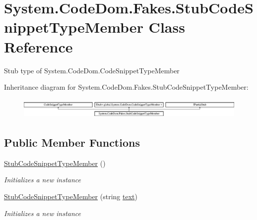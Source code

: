 \hypertarget{class_system_1_1_code_dom_1_1_fakes_1_1_stub_code_snippet_type_member}{\section{System.\-Code\-Dom.\-Fakes.\-Stub\-Code\-Snippet\-Type\-Member Class Reference}
\label{class_system_1_1_code_dom_1_1_fakes_1_1_stub_code_snippet_type_member}
}


Stub type of System.\-Code\-Dom.\-Code\-Snippet\-Type\-Member 


Inheritance diagram for System.\-Code\-Dom.\-Fakes.\-Stub\-Code\-Snippet\-Type\-Member\-:\begin{figure}[H]
\begin{center}
\leavevmode
\includegraphics[height=1.039926cm]{class_system_1_1_code_dom_1_1_fakes_1_1_stub_code_snippet_type_member}
\end{center}
\end{figure}
\subsection*{Public Member Functions}
\begin{DoxyCompactItemize}
\item 
\hyperlink{class_system_1_1_code_dom_1_1_fakes_1_1_stub_code_snippet_type_member_a342fa1fb6899b2dc27a228c2bce1826d}{Stub\-Code\-Snippet\-Type\-Member} ()
\begin{DoxyCompactList}\small\item\em Initializes a new instance\end{DoxyCompactList}\item 
\hyperlink{class_system_1_1_code_dom_1_1_fakes_1_1_stub_code_snippet_type_member_a69fe4ca6b532af69838f17442f3af3e6}{Stub\-Code\-Snippet\-Type\-Member} (string \hyperlink{jquery-1_810_82-vsdoc_8js_aa5b77da29631a344064bb3d20c8702de}{text})
\begin{DoxyCompactList}\small\item\em Initializes a new instance\end{DoxyCompactList}\end{DoxyCompactItemize}
